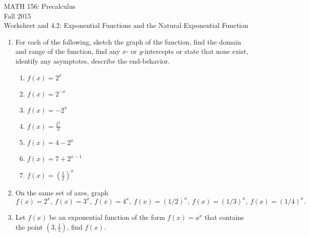 \documentclass[11pt]{article}
\newcommand{\sect}{\textsection}
\begin{document}
 

\begin{center}MATH 156: Precalculus  \\ Fall 2015 \\ Worksheet \sect 4.1 and 4.2: Exponential Functions and the Natural Exponential Function\end{center}

\hrulefill

\begin{enumerate}
\item For each of the following, sketch the graph of the function, find the domain and range of the function, find any $x$- or $y$-intercepts or state that none exist, identify any asymptotes, describe the end-behavior.
\begin{enumerate}
\item $f(x)=2^x $
\vfill
\item $f(x)=2^{-x} $
\vfill
\item $f(x)= -2^x$
\vfill
\item $f(x)=\frac{2^x}{3} $
\vfill
\item $f(x)= 4-2^x$
\vfill
\item $f(x)=7+2^{x-1} $
\vfill
\item $f(x)=\left(\frac{1}{2}\right)^x $
\vfill
\end{enumerate}
\newpage
\item On the same set of axes, graph $f(x)=2^x,\:f(x)=3^x,\:f(x)=4^x,\:f(x)=(1/2)^x,\:f(x)=(1/3)^x,\:f(x)=(1/4)^x.$
\vfill
\item Let $f(x)$ be an exponential function of the form $f(x)=a^x$ that contains the point $(3,\frac{1}{5})$, find $f(x).$
\vfill


\end{enumerate}
\end{document}

